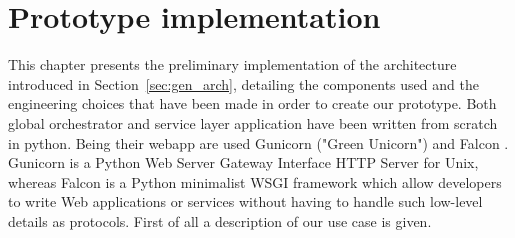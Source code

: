 \chapter{Prototype implementation}
\label{sec:implementation}

This chapter presents the preliminary implementation of the architecture introduced in Section~\ref{sec:gen_arch}, detailing the components used and the engineering choices that have been made in order to create our prototype. Both global orchestrator and service layer application have been written from scratch in python. Being their webapp are used Gunicorn \cite{gunicorn} ("Green Unicorn") and Falcon \cite{falcon}.
Gunicorn is a Python Web Server Gateway Interface HTTP Server for Unix, whereas Falcon is a Python  minimalist  WSGI framework which allow developers to write Web applications or services without having to handle such low-level details as protocols. First of all a description of our use case is given.

